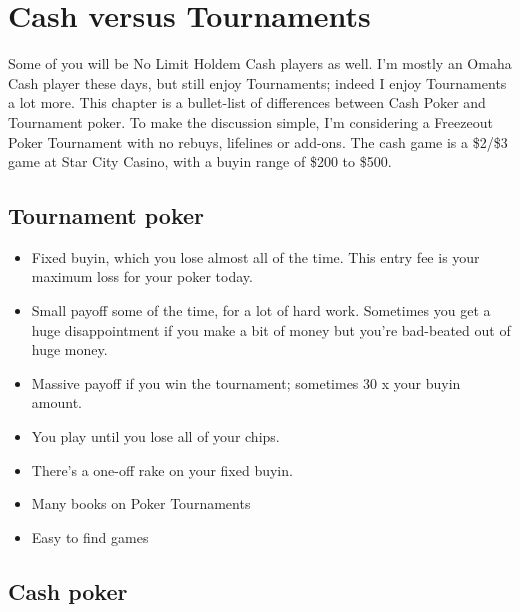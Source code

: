 \chapter{Cash versus Tournaments}

Some of you will be No Limit Holdem Cash players as well. I'm mostly
an Omaha Cash player these days, but still enjoy Tournaments; indeed I
enjoy Tournaments a lot more. This chapter is a bullet-list of
differences between Cash Poker and Tournament poker. To make the
discussion simple, I'm considering a Freezeout Poker Tournament with
no rebuys, lifelines or add-ons. The cash game is a \$2/\$3 game at
Star City Casino, with a buyin range of \$200 to \$500.

\section{Tournament poker}

\begin{itemize}
  \item Fixed buyin, which you lose almost all of the time. This entry
    fee is your maximum loss for your poker today.
  \item Small payoff some of the time, for a lot of hard
    work. Sometimes you get a huge disappointment if you make a bit of
    money but you're bad-beated out of huge money.
  \item Massive payoff if you win the tournament; sometimes 30 x your
    buyin amount.
  \item You play until you lose all of your chips.
  \item There's a one-off rake on your fixed buyin.
  \item Many books on Poker Tournaments
  \item Easy to find games
\end{itemize}

\section{Cash poker}

